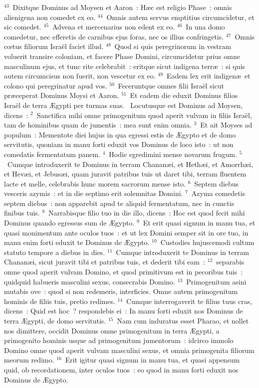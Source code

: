 ${}^{43}$~Dixitque Dominus ad Moysen et Aaron~: H\ae c est religio Phase~: omnis alienigena non comedet ex eo.
${}^{44}$~Omnis autem servus emptitius circumcidetur, et sic comedet.
${}^{45}$~Advena et mercenarius non edent ex eo.
${}^{46}$~In una domo comedetur, nec efferetis de carnibus ejus foras, nec os illius confringetis.
${}^{47}$~Omnis cœtus filiorum Isra\"el faciet illud.
${}^{48}$~Quod si quis peregrinorum in vestram voluerit transire coloniam, et facere Phase Domini, circumcidetur prius omne masculinum ejus, et tunc rite celebrabit~: eritque sicut indigena terr\ae~: si quis autem circumcisus non fuerit, non vescetur ex eo.
${}^{49}$~Eadem lex erit indigen\ae\ et colono qui peregrinatur apud vos.
${}^{50}$~Feceruntque omnes filii Isra\"el sicut pr\ae ceperat Dominus Moysi et Aaron.
${}^{51}$~Et eadem die eduxit Dominus filios Isra\"el de terra \AE gypti per turmas suas.
~\lettrine[lines=10,image=true,loversize=0.05,lraise=-0.03]{L}{}ocutusque est Dominus ad Moysen, dicens~:
${}^{2}$~Sanctifica mihi omne primogenitum quod aperit vulvam in filiis Isra\"el, tam de hominibus quam de jumentis~: mea sunt enim omnia.
${}^{3}$~Et ait Moyses ad populum~: Mementote diei hujus in qua egressi estis de \AE gypto et de domo servitutis, quoniam in manu forti eduxit vos Dominus de loco isto~: ut non comedatis fermentatum panem.
${}^{4}$~Hodie egredimini mense novarum frugum.
${}^{5}$~Cumque introduxerit te Dominus in terram Chanan\ae i, et Heth\ae i, et Amorrh\ae i, et Hev\ae i, et Jebus\ae i, quam juravit patribus tuis ut daret tibi, terram fluentem lacte et melle, celebrabis hunc morem sacrorum mense isto.
${}^{6}$~Septem diebus vesceris azymis~: et in die septimo erit solemnitas Domini.
${}^{7}$~Azyma comedetis septem diebus~: non apparebit apud te aliquid fermentatum, nec in cunctis finibus tuis.
${}^{8}$~Narrabisque filio tuo in die illo, dicens~: Hoc est quod fecit mihi Dominus quando egressus sum de \AE gypto.
${}^{9}$~Et erit quasi signum in manu tua, et quasi monimentum ante oculos tuos~: et ut lex Domini semper sit in ore tuo, in manu enim forti eduxit te Dominus de \AE gypto.
${}^{10}$~Custodies hujuscemodi cultum statuto tempore a diebus in dies.
${}^{11}$~Cumque introduxerit te Dominus in terram Chanan\ae i, sicut juravit tibi et patribus tuis, et dederit tibi eam~:
${}^{12}$~separabis omne quod aperit vulvam Domino, et quod primitivum est in pecoribus tuis~: quidquid habueris masculini sexus, consecrabis Domino.
${}^{13}$~Primogenitum asini mutabis ove~: quod si non redemeris, interficies. Omne autem primogenitum hominis de filiis tuis, pretio redimes.
${}^{14}$~Cumque interrogaverit te filius tuus cras, dicens~: Quid est hoc~? respondebis ei~: In manu forti eduxit nos Dominus de terra \AE gypti, de domo servitutis.
${}^{15}$~Nam cum induratus esset Pharao, et nollet nos dimittere, occidit Dominus omne primogenitum in terra \AE gypti, a primogenito hominis usque ad primogenitum jumentorum~: idcirco immolo Domino omne quod aperit vulvam masculini sexus, et omnia primogenita filiorum meorum redimo.
${}^{16}$~Erit igitur quasi signum in manu tua, et quasi appensum quid, ob recordationem, inter oculos tuos~: eo quod in manu forti eduxit nos Dominus de \AE gypto.


